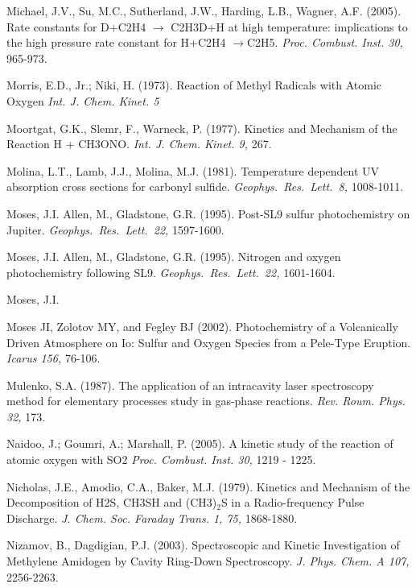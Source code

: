 \documentclass[12pt,landscape]{article}
\newcounter{reaction}
\newcounter{photo}
\begin{document}
Michael, J.V., Su, M.C., Sutherland, J.W., Harding, L.B., Wagner, A.F.  (2005). Rate constants for D+C2H4 $\rightarrow$ C2H3D+H at high temperature: implications to the high pressure rate constant for H+C2H4 $\rightarrow$C2H5.  {\em Proc. Combust. Inst. 30,} 965-973.

Morris, E.D., Jr.; Niki, H. (1973).
Reaction of Methyl Radicals with Atomic Oxygen
{\em Int. J. Chem. Kinet. 5}

Moortgat, G.K., Slemr, F., Warneck, P. (1977). Kinetics and Mechanism of the Reaction H + CH3ONO. {\em  Int. J. Chem. Kinet.  9,} 267.

Molina, L.T., Lamb, J.J., Molina, M.J.  (1981). Temperature dependent UV absorption cross sections for carbonyl sulfide. {\em Geophys.\ Res.\ Lett.\ 8,} 1008-1011.

Moses, J.I. Allen, M., Gladstone, G.R. (1995).	Post-SL9 sulfur photochemistry on Jupiter. {\em Geophys.\ Res.\ Lett.\ 22,} 1597-1600.

Moses, J.I. Allen, M., Gladstone, G.R. (1995).	Nitrogen and oxygen photochemistry following SL9. {\em Geophys.\ Res.\ Lett.\ 22,} 1601-1604.

Moses, J.I. 

Moses JI, Zolotov MY, and Fegley BJ (2002). Photochemistry of a Volcanically Driven Atmosphere on Io: Sulfur and Oxygen Species from a Pele-Type Eruption. {\em Icarus 156,} 76-106.

Mulenko, S.A. (1987). The application of an intracavity laser spectroscopy method for elementary processes study in gas-phase reactions. {\em Rev. Roum. Phys. 32,} 173.

Naidoo, J.; Goumri, A.; Marshall, P. (2005).
 A kinetic study of the reaction of atomic oxygen with SO2
{\em Proc. Combust. Inst. 30,} 1219 - 1225.

Nicholas, J.E., Amodio, C.A., Baker, M.J. (1979).  Kinetics and Mechanism of the Decomposition of H2S, CH3SH and (CH3)$_2$S in a Radio-frequency Pulse Discharge. {\em J. Chem. Soc. Faraday Trans. 1, 75,} 1868-1880.

Nizamov, B., Dagdigian, P.J. (2003).  Spectroscopic and Kinetic Investigation of Methylene Amidogen by Cavity Ring-Down Spectroscopy. {\em J. Phys. Chem. A 107,} 2256-2263.
\end{document}
